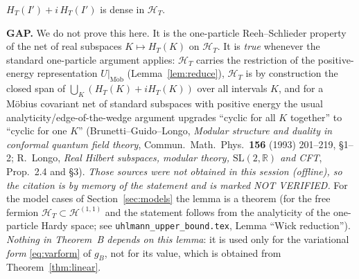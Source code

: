 \documentclass[11pt]{article}
\newcommand{\Hil}{\mathcal H}
\newcommand{\gB}{g_B}
\newcommand{\HT}{\Hil_T}
\newcommand{\HTR}{H_T}
\begin{document}
\begin{lemma}\label{lem:RST}
$\HTR(I')+i\,\HTR(I')$ is dense in $\HT$.
\end{lemma}

\begin{verdictgap}
\textbf{GAP.}  We do not prove this here.  It is the one-particle Reeh--Schlieder property of the net of
real subspaces $K\mapsto\HTR(K)$ on $\HT$.  It is \emph{true} whenever the standard one-particle argument
applies: $\HT$ carries the restriction of the positive-energy representation $U|_{\mathrm{M\ddot ob}}$
(Lemma~\ref{lem:reduce}), $\HT$ is by construction the closed span of $\bigcup_K(\HTR(K)+i\HTR(K))$ over all
intervals $K$, and for a M\"obius covariant net of standard subspaces with positive energy the usual
analyticity/edge-of-the-wedge argument upgrades ``cyclic for all $K$ together'' to ``cyclic for one $K$''
(Brunetti--Guido--Longo, \emph{Modular structure and duality in conformal quantum field theory},
Commun.\ Math.\ Phys.\ \textbf{156} (1993) 201--219, \S{}1--2; R.~Longo, \emph{Real Hilbert subspaces,
modular theory, $\mathrm{SL}(2,\mathbb R)$ and CFT}, Prop.~2.4 and \S{}3).  \emph{Those sources were not
obtained in this session (offline), so the citation is by memory of the statement and is marked
NOT VERIFIED.}  For the model cases of Section~\ref{sec:models} the lemma is a theorem
(for the free fermion $\HT\subset\mathcal H^{(1,1)}$ and the statement follows from the analyticity of the
one-particle Hardy space; see \texttt{uhlmann\_upper\_bound.tex}, Lemma ``Wick reduction'').
\emph{Nothing in Theorem~B depends on this lemma}: it is used only for the variational \emph{form}
\eqref{eq:varform} of $\gB$, not for its value, which is obtained from Theorem~\ref{thm:linear}.
\end{verdictgap}
\end{document}
